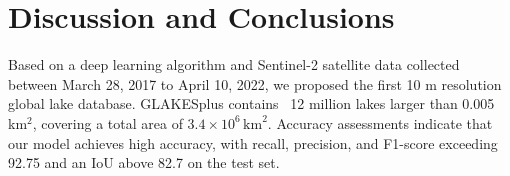 \documentclass[preprint,12pt,authoryear]{elsarticle}
\begin{document}
\section{Discussion and Conclusions}
\label{sec4}

Based on a deep learning algorithm  and Sentinel-2 satellite data collected between March 28, 2017 to April 10, 2022, we proposed the first 10 m resolution global lake database. GLAKESplus contains ~12 million lakes larger than 0.005 km$^2$, covering a total area of  $3.4 \times 10^6\, \text{km}^2$. Accuracy assessments indicate that our model achieves high accuracy, with recall, precision, and F1-score exceeding 92.75 and an IoU above 82.7 on the test set. 
\end{document}
